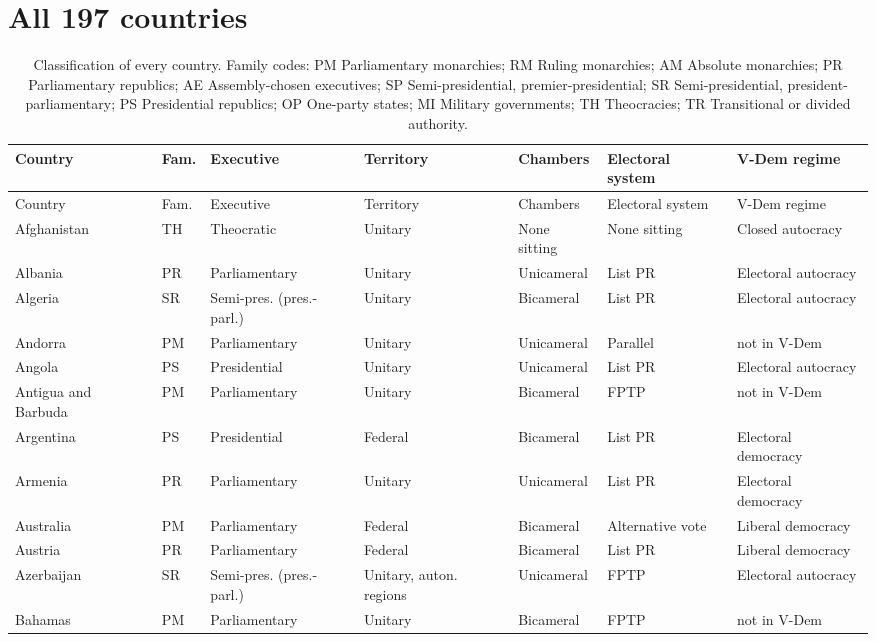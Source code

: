 \documentclass[11pt,a4paper]{article}
\begin{document}
\clearpage
\appendix
\section{All 197 countries}
{\tiny\setlength{\tabcolsep}{2.5pt}\renewcommand{\arraystretch}{0.92}\begin{longtable}{p{2.9cm}lp{2.9cm}p{2.4cm}lp{1.9cm}p{2.0cm}}\caption{Classification of every country. Family codes: PM Parliamentary monarchies; RM Ruling monarchies; AM Absolute monarchies; PR Parliamentary republics; AE Assembly-chosen executives; SP Semi-presidential, premier-presidential; SR Semi-presidential, president-parliamentary; PS Presidential republics; OP One-party states; MI Military governments; TH Theocracies; TR Transitional or divided authority.}\\\toprule Country & Fam. & Executive & Territory & Chambers & Electoral system & V-Dem regime\\\midrule\endfirsthead\toprule Country & Fam. & Executive & Territory & Chambers & Electoral system & V-Dem regime\\\midrule\endhead
Afghanistan & TH & Theocratic & Unitary & None sitting & None sitting & Closed autocracy\\
Albania & PR & Parliamentary & Unitary & Unicameral & List PR & Electoral autocracy\\
Algeria & SR & Semi-pres. (pres.-parl.) & Unitary & Bicameral & List PR & Electoral autocracy\\
Andorra & PM & Parliamentary & Unitary & Unicameral & Parallel & not in V-Dem\\
Angola & PS & Presidential & Unitary & Unicameral & List PR & Electoral autocracy\\
Antigua and Barbuda & PM & Parliamentary & Unitary & Bicameral & FPTP & not in V-Dem\\
Argentina & PS & Presidential & Federal & Bicameral & List PR & Electoral democracy\\
Armenia & PR & Parliamentary & Unitary & Unicameral & List PR & Electoral democracy\\
Australia & PM & Parliamentary & Federal & Bicameral & Alternative vote & Liberal democracy\\
Austria & PR & Parliamentary & Federal & Bicameral & List PR & Liberal democracy\\
Azerbaijan & SR & Semi-pres. (pres.-parl.) & Unitary, auton. regions & Unicameral & FPTP & Electoral autocracy\\
Bahamas & PM & Parliamentary & Unitary & Bicameral & FPTP & not in V-Dem\\

\end{longtable}}
\end{document}
